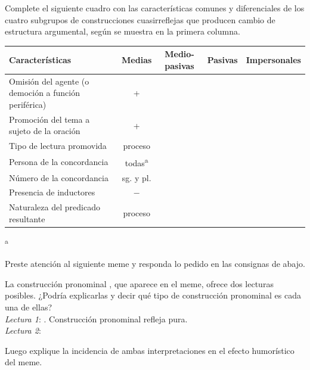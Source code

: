 \begin{ejercicio}\label{ej:10-cuadro}
Complete el siguiente cuadro con las características comunes y diferenciales de
los cuatro subgrupos de construcciones cuasirreflejas que producen cambio de
estructura argumental, según se muestra en la primera columna.

{\small
\begin{tabularx}{\linewidth}{@{}L c c c c@{}}
  \toprule
  Características & Medias & Medio-pasivas & Pasivas & Impersonales \\
  \midrule
  Omisión del agente (o democión a función periférica) & + & & & \\
  Promoción del tema a sujeto de la oración & + & & & \\
  Tipo de lectura promovida & proceso & & & \\
  Persona de la concordancia & todas\textsuperscript{a} & & & \\
  Número de la concordancia & sg. y pl. & & & \\
  Presencia de inductores & $-$ & & & \\
  Naturaleza del predicado resultante & proceso & & & \\
  \bottomrule
\end{tabularx}}

\textsuperscript{a} 
\end{ejercicio}

\begin{ejercicio}\label{ej:10-meme}
Preste atención al siguiente meme y responda lo pedido en las consignas de
abajo.


\begin{consignas}
  \item La construcción pronominal , que aparece en el meme,
        ofrece dos lecturas posibles. ¿Podría explicarlas y decir qué tipo de
        construcción pronominal es cada una de ellas?\\
        \textit{Lectura 1}: .
        Construcción pronominal refleja pura.\\
        \textit{Lectura 2}: \completar[3]
  \item Luego explique la incidencia de ambas interpretaciones en el efecto
        humorístico del meme.
\end{consignas}
\end{ejercicio}

